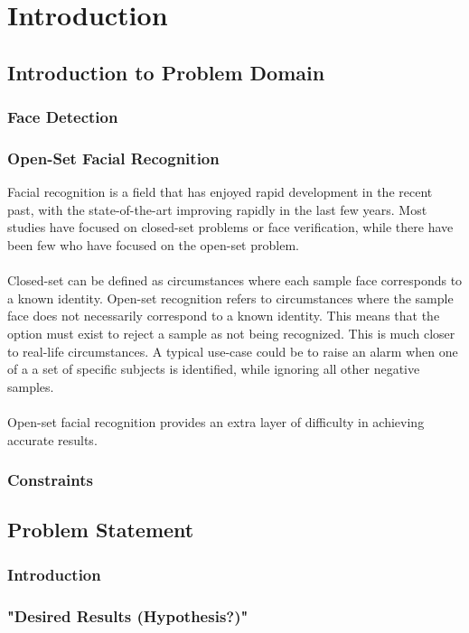\chapter{Introduction}
    \section{Introduction to Problem Domain}
	\subsection{Face Detection}
    \subsection{Open-Set Facial Recognition}
Facial recognition is a field that has enjoyed rapid development in the recent past, with the state-of-the-art improving rapidly in the last few years.  Most studies have focused on closed-set problems or face verification, while there have been few who have focused on the open-set problem.
\\
\\
Closed-set can be defined as circumstances where each sample face corresponds to a known identity.  Open-set recognition refers to circumstances where the sample face does not necessarily correspond to a known identity.  This means that the option must exist to reject a sample as not being recognized.  This is much closer to real-life circumstances.  A typical use-case could be to raise an alarm when one of a a set of specific subjects is identified, while ignoring all other negative samples.
\\
\\
Open-set facial recognition provides an extra layer of difficulty in achieving accurate results.
	\subsection{Constraints}
    \section{Problem Statement}
    \subsection{Introduction}
    \subsection{"Desired Results (Hypothesis?)"}
